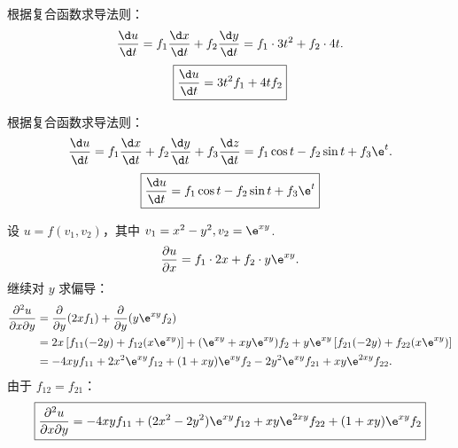 \begin{solution}

    根据复合函数求导法则：
    \begin{equation}
        \frac{\d u}{\d t} = f_1 \frac{\d x}{\d t} + f_2 \frac{\d y}{\d t} = f_1 \cdot 3t^2 + f_2 \cdot 4t.
    \end{equation}
    \begin{equation}
        \boxed{\frac{\d u}{\d t} = 3t^2 f_1 + 4t f_2}
    \end{equation}


    根据复合函数求导法则：
    \begin{equation}
        \frac{\d u}{\d t} = f_1 \frac{\d x}{\d t} + f_2 \frac{\d y}{\d t} + f_3 \frac{\d z}{\d t} = f_1 \cos t - f_2 \sin t + f_3 \e^t.
    \end{equation}
    \begin{equation}
        \boxed{\frac{\d u}{\d t} = f_1 \cos t - f_2 \sin t + f_3 \e^t}
    \end{equation}


    设 $u = f(v_1, v_2)$，其中 $v_1 = x^2 - y^2, v_2 = \e^{xy}$.
    \begin{equation}
        \frac{\partial u}{\partial x} = f_1 \cdot 2x + f_2 \cdot y \e^{xy}.
    \end{equation}
    继续对 $y$ 求偏导：
    \begin{equation}
        \begin{aligned}
            \frac{\partial^2 u}{\partial x \partial y} & = \frac{\partial}{\partial y} (2x f_1) + \frac{\partial}{\partial y} (y \e^{xy} f_2)                                                        \\
                                                       & = 2x \left[ f_{11}(-2y) + f_{12}(x \e^{xy}) \right] + (\e^{xy} + xy \e^{xy}) f_2 + y \e^{xy} \left[ f_{21}(-2y) + f_{22}(x \e^{xy}) \right] \\
                                                       & = -4xy f_{11} + 2x^2 \e^{xy} f_{12} + (1 + xy) \e^{xy} f_2 - 2y^2 \e^{xy} f_{21} + xy \e^{2xy} f_{22}.
        \end{aligned}
    \end{equation}
    由于 $f_{12} = f_{21}$：
    \begin{equation}
        \boxed{\frac{\partial^2 u}{\partial x \partial y} = -4xy f_{11} + (2x^2 - 2y^2) \e^{xy} f_{12} + xy \e^{2xy} f_{22} + (1+xy) \e^{xy} f_2}
    \end{equation}


\end{solution}
